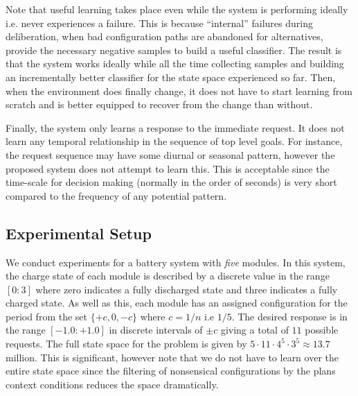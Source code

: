 Note that useful learning takes place even while the system is performing ideally i.e. never experiences a failure. This is because ``internal'' failures during deliberation, when bad configuration paths are abandoned for alternatives, provide the necessary negative samples to build a useful classifier. The result is that the system works ideally while all the time collecting samples and building an incrementally better classifier for the state space experienced so far. Then, when the environment does finally change, it does not have to start learning from scratch and is better equipped to recover from the change than without.

Finally, the system only learns a response to the immediate request. It does not learn any temporal relationship in the sequence of top level goals. For instance, the request sequence may have some diurnal or seasonal pattern, however the proposed system does not attempt to learn this. This is acceptable since the time-scale for decision making (normally in the order of seconds) is very short compared to the frequency of any potential pattern.




\subsection{Experimental Setup}\label{subsec:setup}

We conduct experiments for a battery system with {\em five} modules. In this system, the charge state of each module is described by a discrete value in the range $[0:3]$ where zero indicates a fully discharged state and three indicates a fully charged state. As well as this, each module has an assigned configuration for the period from the set $\{+c, 0, -c\}$ where $c=1/n$ i.e $1/5$. The desired response is in the range $[-1.0:+1.0]$ in discrete intervals of $\pm c$ giving a total of $11$ possible requests. The full state space for the problem is given by $5 \cdot 11 \cdot 4^5 \cdot 3^5 \approx 13.7$ million. This is significant, however note that we do not have to learn over the entire state space since the filtering of nonsensical configurations by the plans context conditions reduces the space dramatically.

